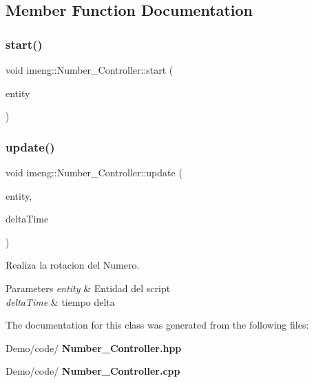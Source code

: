\subsection{Member Function Documentation}
\mbox{\label{classimeng_1_1_number___controller_a26d01e47ace6b518a6aff78e70e54e72}} 
\subsubsection{start()}
{\footnotesize\ttfamily void imeng\+::\+Number\+\_\+\+Controller\+::start (\begin{DoxyParamCaption}\item[{Entity $\ast$}]{entity }\end{DoxyParamCaption})\hspace{0.3cm}{\ttfamily [override]}}

\mbox{\label{classimeng_1_1_number___controller_af8043b6df97e85a213cdd4b1d6041b6e}} 
\subsubsection{update()}
{\footnotesize\ttfamily void imeng\+::\+Number\+\_\+\+Controller\+::update (\begin{DoxyParamCaption}\item[{Entity $\ast$}]{entity,  }\item[{float}]{delta\+Time }\end{DoxyParamCaption})\hspace{0.3cm}{\ttfamily [override]}}



Realiza la rotacion del Numero. 


\begin{DoxyParams}{Parameters}
{\em entity} & Entidad del script \\
\hline
{\em delta\+Time} & tiempo delta \\
\hline
\end{DoxyParams}


The documentation for this class was generated from the following files\+:\begin{DoxyCompactItemize}
\item 
Demo/code/\textbf{ Number\+\_\+\+Controller.\+hpp}\item 
Demo/code/\textbf{ Number\+\_\+\+Controller.\+cpp}\end{DoxyCompactItemize}
